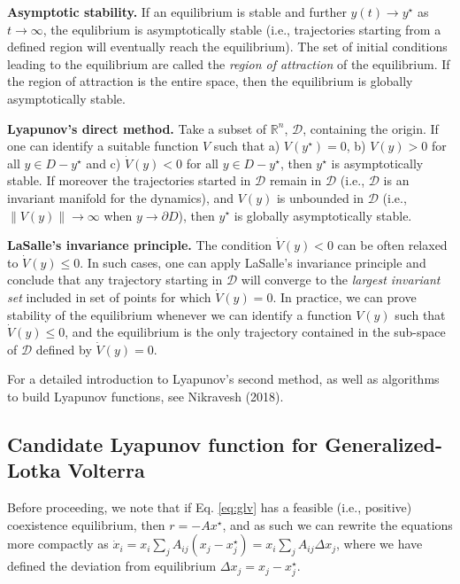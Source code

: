 \documentclass{article}
\begin{document}
\textbf{Asymptotic stability.} If an equilibrium is stable and further
\(y(t) \to y^\star\) as \(t \to \infty\), the equlibrium is
asymptotically stable (i.e., trajectories starting from a defined region
will eventually reach the equilibrium). The set of initial conditions
leading to the equilibrium are called the \emph{region of attraction} of
the equilibrium. If the region of attraction is the entire space, then
the equilibrium is globally asymptotically stable.

\textbf{Lyapunov's direct method.} Take a subset of \(\mathbb R^n\),
\(\mathcal D\), containing the origin. If one can identify a suitable
function \(V\) such that a) \(V(y^\star) = 0\), b) \(V(y) > 0\) for all
\(y \in D - y^\star\) and c) \(\dot{V}(y) <0\) for all
\(y \in D - y^\star\), then \(y^\star\) is asymptotically stable. If
moreover the trajectories started in \(\mathcal D\) remain in
\(\mathcal D\) (i.e., \(\mathcal D\) is an invariant manifold for the
dynamics), and \(V(y)\) is unbounded in \(\mathcal D\) (i.e.,
\(\lVert V(y) \rVert \to \infty\) when \(y \to \partial D\)), then
\(y^\star\) is globally asymptotically stable.

\textbf{LaSalle's invariance principle.} The condition
\(\dot{V}(y) < 0\) can be often relaxed to \(\dot{V}(y) \leq 0\). In
such cases, one can apply LaSalle's invariance principle and conclude
that any trajectory starting in \(\mathcal D\) will converge to the
\emph{largest invariant set} included in set of points for which
\(\dot{V}(y) = 0\). In practice, we can prove stability of the
equilibrium whenever we can identify a function \(V(y)\) such that
\(\dot{V}(y) \leq 0\), and the equilibrium is the only trajectory
contained in the sub-space of \(\mathcal D\) defined by
\(\dot{V}(y) = 0\).

For a detailed introduction to Lyapunov's second method, as well as
algorithms to build Lyapunov functions, see Nikravesh (2018).

\hypertarget{candidate-lyapunov-function-for-generalized-lotka-volterra}{%
\subsection{Candidate Lyapunov function for Generalized-Lotka
Volterra}\label{candidate-lyapunov-function-for-generalized-lotka-volterra}}

Before proceeding, we note that if Eq. \ref{eq:glv} has a feasible
(i.e., positive) coexistence equilibrium, then \(r = -A x^\star\), and
as such we can rewrite the equations more compactly as
\(\dot{x}_i = x_i \sum_{j} A_{ij} (x_j - x_j^\star) = x_i \sum_{j} A_{ij} \Delta x_j\),
where we have defined the deviation from equilibrium
\(\Delta x_j = x_j - x_j^\star\).
\end{document}
